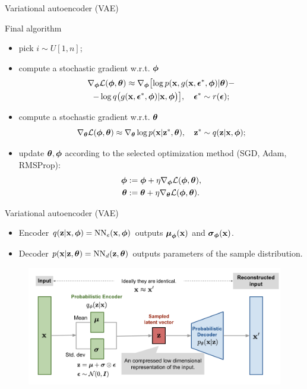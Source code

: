 \begin{frame}{Variational autoencoder (VAE)}
	\begin{block}{Final algorithm}
		\begin{itemize}
			\item pick $i \sim U[1, n]$;
			\item compute a stochastic gradient w.r.t. $\boldsymbol{\phi}$
			\begin{multline*}
				\nabla_{\boldsymbol{\phi}} \mathcal{L} (\boldsymbol{\phi}, \boldsymbol{\theta}) \approx \nabla_{\boldsymbol{\phi}} \bigl[\log p(\mathbf{x}, g(\mathbf{x}, \boldsymbol{\epsilon}^*, \boldsymbol{\phi}) | \boldsymbol{\theta})  - \\ - \log q\bigl(g(\mathbf{x}, \boldsymbol{\epsilon}^*, \boldsymbol{\phi}) | \mathbf{x}, \boldsymbol{\phi} \bigr)\bigr], \quad \boldsymbol{\epsilon}^* \sim r(\boldsymbol{\epsilon});
			\end{multline*}
			\item compute a stochastic gradient w.r.t. $\boldsymbol{\theta}$
			\[
			\nabla_{\boldsymbol{\theta}} \mathcal{L} (\boldsymbol{\phi}, \boldsymbol{\theta}) \approx \nabla_{\boldsymbol{\theta}} \log p(\mathbf{x}|\mathbf{z}^*, \boldsymbol{\theta}), \quad \mathbf{z}^* \sim q(\mathbf{z}|\mathbf{x}, \boldsymbol{\phi});
			\]
			\item update $\boldsymbol{\theta}, \boldsymbol{\phi}$ according to the selected optimization method (SGD, Adam, RMSProp):
			\begin{align*}
				\boldsymbol{\phi} &:= \boldsymbol{\phi} + \eta \nabla_{\boldsymbol{\phi}} \mathcal{L}(\boldsymbol{\phi}, \boldsymbol{\theta}), \\
				\boldsymbol{\theta} &:= \boldsymbol{\theta} + \eta \nabla_{\boldsymbol{\theta}} \mathcal{L}(\boldsymbol{\phi}, \boldsymbol{\theta}).
			\end{align*}
		\end{itemize}
	\end{block}
\end{frame}
\begin{frame}{Variational autoencoder (VAE)}
	\begin{itemize}
		\item Encoder $q(\mathbf{z} | \mathbf{x}, \boldsymbol{\phi}) = \text{NN}_e(\mathbf{x}, \boldsymbol{\phi})$ outputs $\boldsymbol{\mu}_{\boldsymbol{\phi}}(\mathbf{x})$ and $\boldsymbol{\sigma}_{\boldsymbol{\phi}}(\mathbf{x})$.
		\item Decoder $p(\mathbf{x} | \mathbf{z}, \boldsymbol{\theta}) = \text{NN}_d(\mathbf{z}, \boldsymbol{\theta})$ outputs parameters of the sample distribution.
	\end{itemize}
	\begin{figure}[h]
		\centering
		\includegraphics[width=\linewidth]{figs/vae-gaussian.png}
	\end{figure}
	
\end{frame}
